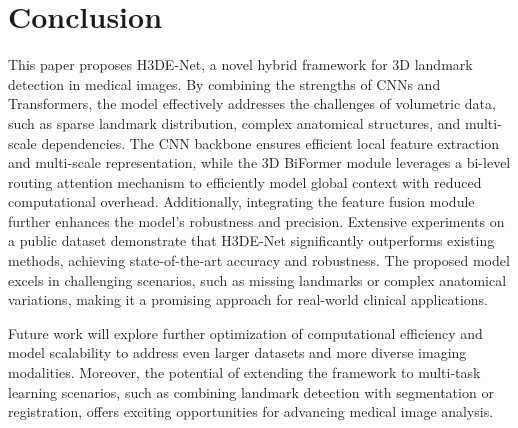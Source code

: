 \section{Conclusion}
This paper proposes H3DE-Net, a novel hybrid framework for 3D landmark detection in medical images. By combining the strengths of CNNs and Transformers, the model effectively addresses the challenges of volumetric data, such as sparse landmark distribution, complex anatomical structures, and multi-scale dependencies. The CNN backbone ensures efficient local feature extraction and multi-scale representation, while the 3D BiFormer module leverages a bi-level routing attention mechanism to efficiently model global context with reduced computational overhead. Additionally, integrating the feature fusion module further enhances the model’s robustness and precision. Extensive experiments on a public dataset demonstrate that H3DE-Net significantly outperforms existing methods, achieving state-of-the-art accuracy and robustness. The proposed model excels in challenging scenarios, such as missing landmarks or complex anatomical variations, making it a promising approach for real-world clinical applications.

Future work will explore further optimization of computational efficiency and model scalability to address even larger datasets and more diverse imaging modalities. Moreover, the potential of extending the framework to multi-task learning scenarios, such as combining landmark detection with segmentation or registration, offers exciting opportunities for advancing medical image analysis.






